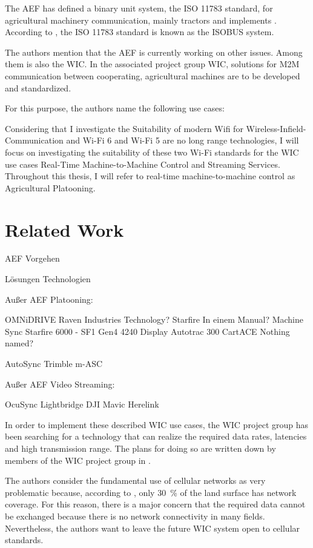 \documentclass[]{nsm-thesis}
\begin{document}
The AEF has defined a binary unit system, the ISO 11783 standard, for agricultural machinery communication, mainly tractors and implements \cite{iglesias_enabling_2014}. According to \textcite{schlingmann_aef_2019}, the ISO 11783 standard is known as the ISOBUS system.

The authors mention that the AEF is currently working on other issues. Among them is also the \ac{WIC}. In the associated project group \ac{WIC}, solutions for \ac{M2M} communication between cooperating, agricultural machines are to be developed and standardized.

For this purpose, the authors name the following use cases:


Considering that I investigate the Suitability of modern Wifi for Wireless-Infield-Communication and Wi-Fi 6 and Wi-Fi 5 are no long range technologies, I will focus on investigating the suitability of these two Wi-Fi standards for the \ac{WIC} use cases Real-Time Machine-to-Machine Control and Streaming Services. Throughout this thesis, I will refer to real-time machine-to-machine control as Agricultural Platooning.
\section{Related Work}
AEF Vorgehen

Lösungen
Technologien

Außer AEF Platooning:

	OMNiDRIVE Raven Industries Technology? Starfire In einem Manual?
	Machine Sync Starfire 6000 - SF1 Gen4 4240 Display Autotrac 300 
	CartACE Nothing named? 
	
	AutoSync Trimble m-ASC

Außer AEF Video Streaming:

	OcuSync
	Lightbridge DJI Mavic
	Herelink


In order to implement these described \ac{WIC} use cases, the \ac{WIC} project group has been searching for a technology that can realize the required data rates, latencies and high transmission range. The plans for doing so are written down by members of the \ac{WIC} project group in \cite{schlingmann_challenges_2017}.

The authors consider the fundamental use of cellular networks as very problematic because, according to \cite{noauthor_ict_2016}, only \SI{30}{\percent} of the land surface has network coverage. For this reason, there is a major concern that the required data cannot be exchanged because there is no network connectivity in many fields. Nevertheless, the authors want to leave the future \ac{WIC} system open to cellular standards.
\end{document}
